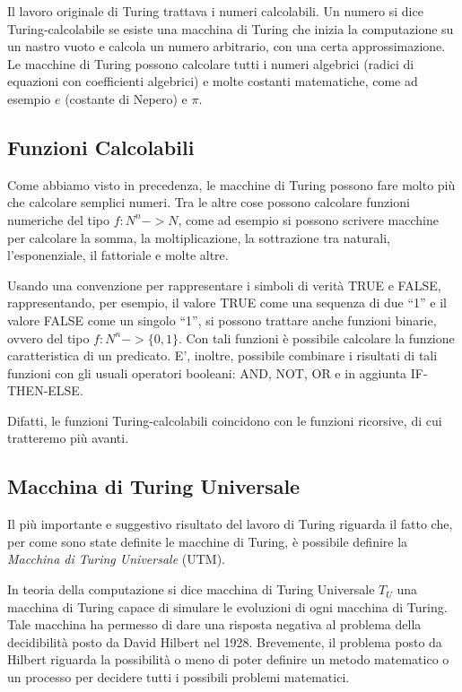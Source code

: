 Il lavoro originale di Turing trattava i numeri calcolabili. Un numero
si dice Turing-calcolabile se esiste una macchina di Turing che inizia
la computazione su un nastro vuoto e calcola un numero arbitrario, con
una certa approssimazione. Le macchine di Turing possono calcolare
tutti i numeri algebrici (radici di equazioni con coefficienti
algebrici) e molte costanti matematiche, come ad esempio $\textit{e}$
(costante di Nepero) e $\pi$.

\subsection{Funzioni Calcolabili}

Come abbiamo visto in precedenza, le macchine di Turing possono fare
molto pi\`u che calcolare semplici numeri. Tra le altre cose possono
calcolare funzioni numeriche del tipo $f:N^{n}->N$, come ad esempio si
possono scrivere macchine per calcolare la somma, la moltiplicazione,
la sottrazione tra naturali, l'esponenziale, il fattoriale e molte
altre.

Usando una convenzione per rappresentare i simboli di verit\`a TRUE e
FALSE, rappresentando, per esempio, il valore TRUE come una sequenza
di due ``1'' e il valore FALSE come un singolo ``1'', si possono
trattare anche funzioni binarie, ovvero del tipo
$f:N^{n}->\{0,1\}$. Con tali funzioni \`e possibile calcolare la
funzione caratteristica di un predicato. E', inoltre, possibile
combinare i risultati di tali funzioni con gli usuali operatori
booleani: AND, NOT, OR e in aggiunta IF-THEN-ELSE.

Difatti, le funzioni Turing-calcolabili coincidono con le funzioni
ricorsive, di cui tratteremo pi\`u avanti.

\subsection{Macchina di Turing Universale}

Il pi\`u importante e suggestivo risultato del lavoro di Turing
riguarda il fatto che, per come sono state definite le macchine di
Turing, \`e possibile definire la \textit{Macchina di Turing
  Universale} (UTM).

In teoria della computazione si dice macchina di Turing Universale
$T_U$ una macchina di Turing capace di simulare le evoluzioni di ogni
macchina di Turing. Tale macchina ha permesso di dare una risposta
negativa al problema della decidibilit\`a posto da David Hilbert nel
1928. Brevemente, il problema posto da Hilbert riguarda la
possibilit\`a o meno di poter definire un metodo matematico o un
processo per decidere tutti i possibili problemi matematici.

